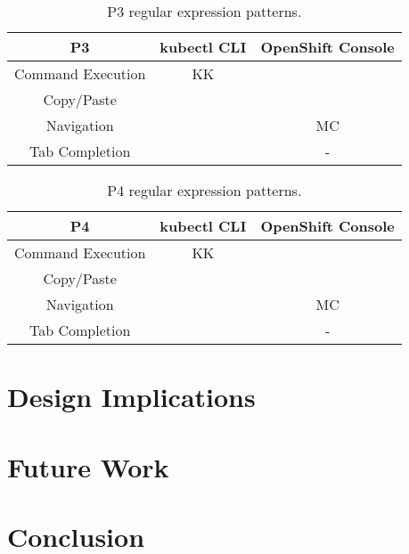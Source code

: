 \documentclass[11pt, oneside]{article}   	%
\begin{document}
\begin{table}
 \centering
  \begin{tabular}{ | c | c | c | } 
  \hline
  P3 & kubectl CLI & OpenShift Console \\ 
  \hline
  Command Execution & KK &  \\ 
  \hline
  Copy/Paste & & \\
  \hline
  Navigation & & MC \\
  \hline
  Tab Completion & & - \\
  \hline
  \end{tabular}
 \caption{P3 regular expression patterns.}
 \label{table:t8}
\end{table}

\begin{table}
 \centering
  \begin{tabular}{ | c | c | c | } 
  \hline
  P4 & kubectl CLI & OpenShift Console \\ 
  \hline
  Command Execution & KK &  \\ 
  \hline
  Copy/Paste &  & \\
  \hline
  Navigation & & MC \\
  \hline
  Tab Completion & & - \\
  \hline
  \end{tabular}
 \caption{P4 regular expression patterns.}
 \label{table:t9}
\end{table}

\section{Design Implications}

\section{Future Work}

\section{Conclusion}



\end{document}
